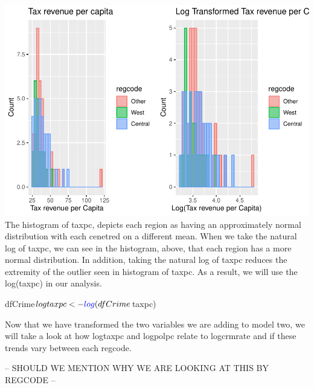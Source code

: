 \documentclass[]{article}
\newenvironment{Shaded}{}{}
\newcommand{\KeywordTok}[1]{\textcolor[rgb]{0.00,0.00,1.00}{#1}}
\newcommand{\NormalTok}[1]{#1}
\newcommand{\OperatorTok}[1]{#1}
\newcommand{\StringTok}[1]{\textcolor[rgb]{0.00,0.50,0.50}{#1}}
\begin{document}
\includegraphics{Bagnard_Gaustad_Hartman_Leung_Lab_3_files/figure-latex/unnamed-chunk-68-1.pdf}
The histogram of taxpc, depicts each region as having an approximately
normal distribution with each cenetred on a different mean. When we take
the natural log of taxpc, we can see in the histogram, above, that each
region has a more normal distribution. In addition, taking the natural
log of taxpc reduces the extremity of the outlier seen in histogram of
taxpc. As a result, we will use the log(taxpc) in our analysis.

\begin{Shaded}
\begin{Highlighting}[]
\NormalTok{dfCrime}\OperatorTok{$}\NormalTok{logtaxpc <-}\StringTok{ }\KeywordTok{log}\NormalTok{(dfCrime}\OperatorTok{$}\NormalTok{taxpc)}
\end{Highlighting}
\end{Shaded}

Now that we have transformed the two variables we are adding to model
two, we will take a look at how logtaxpc and logpolpc relate to
logcrmrate and if these trends vary between each regcode.

-- SHOULD WE MENTION WHY WE ARE LOOKING AT THIS BY REGCODE --
\end{document}
